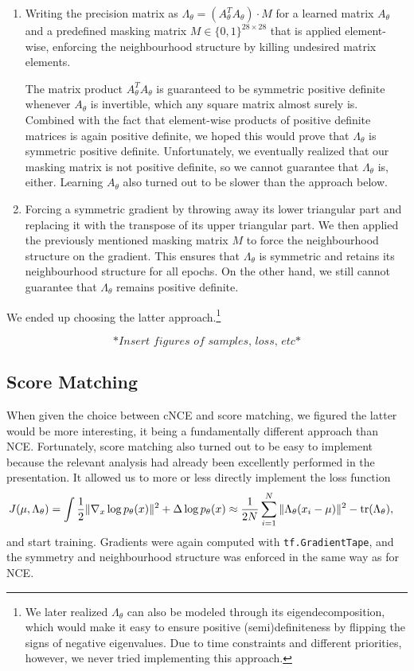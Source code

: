 \documentclass[a4paper]{article}
\theoremstyle{definition}
\theoremstyle{plain}
\begin{document}
\begin{enumerate}
\item Writing the precision matrix as $\Lambda_\theta = (A_\theta ^T A_\theta) \cdot M$ for a learned matrix $A_\theta$ and a pre\-defined masking matrix $M \in \{0,1\}^{28\times 28}$ that is applied element-wise, enforcing the neighbourhood structure by killing undesired matrix elements.

The matrix product $A_\theta^T A_\theta$ is guaranteed to be symmetric positive definite whenever $A_\theta$ is invertible, which any square matrix almost surely is. Combined with the fact that element-wise products of positive definite matrices is again positive definite, we hoped this would prove that $\Lambda_\theta$ is symmetric positive definite. Unfortunately, we eventually realized that our masking matrix is not positive definite, so we cannot guarantee that $\Lambda_\theta$ is, either. Learning $A_\theta$ also turned out to be slower than the approach below.

\item Forcing a symmetric gradient by throwing away its lower triangular part and replacing it with the transpose of its upper triangular part. We then applied the previously mentioned masking matrix $M$ to force the neighbourhood structure on the gradient. This ensures that $\Lambda_\theta$ is symmetric and retains its neighbourhood structure for all epochs. On the other hand, we still cannot guarantee that $\Lambda_\theta$ remains positive definite.
\end{enumerate}
We ended up choosing the latter approach.\footnote{We later realized $\Lambda_\theta$ can also be modeled through its eigendecomposition, which would make it easy to ensure positive (semi)definiteness by flipping the signs of negative eigenvalues. Due to time constraints and different priorities, however, we never tried implementing this approach.}

$$\textit{*Insert figures of samples, loss, etc*}$$

\subsection*{Score Matching}

When given the choice between cNCE and score matching, we figured the latter would be more interesting, it being a fundamentally different approach than NCE. Fortunately, score matching also turned out to be easy to implement because the relevant analysis had already been excellently performed in the presentation. It allowed us to more or less directly implement the loss function
\begin{alignat*}{1}
J(\mu,\Lambda_\theta) &= \int \frac{1}{2} \|\nabla_x \log p_\theta(x)\|^2 + \Delta \log p_\theta(x) \approx \frac{1}{2N} \sum_{i=1}^N \| \Lambda_\theta (x_i - \mu)\|^2 - \tr(\Lambda_\theta),
\end{alignat*}
and start training. Gradients were again computed with \texttt{tf.GradientTape}, and the symmetry and neighbourhood structure was enforced in the same way as for NCE.
\end{document}
